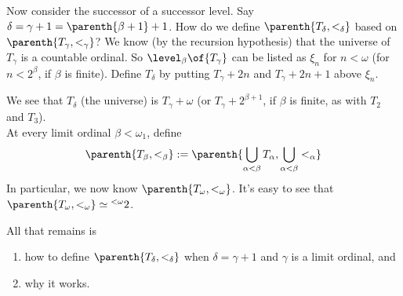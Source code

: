 \begin{boxconstruction}
    Now consider the successor of a successor level. Say $\delta = \gamma + 1 = \parenth{\beta + 1} + 1$. How do we define $\parenth{T_{\delta}, <_{\delta}}$ based on $\parenth{T_{\gamma}, <_{\gamma}}$? We know (by the recursion hypothesis) that the universe of $T_{\gamma}$ is a countable ordinal. So $\level_{\beta}\of{T_{\gamma}}$ can be listed as $\xi_n$ for $n < \omega$ (for $n < 2^{\beta}$, if $\beta$ is finite). Define $T_{\delta}$ by putting $T_{\gamma} + 2n$ and $T_{\gamma} + 2n + 1$ above $\xi_n$.
    \begin{figure}[H]
        \centering
    \end{figure}
    We see that $T_{\delta}$ (the universe) is $T_{\gamma} + \omega$ (or $T_{\gamma} + 2^{\beta + 1}$, if $\beta$ is finite, as with $T_2$ and $T_3$). \\

    At every limit ordinal $\beta < \omega_1$, define
    \begin{align*}
        \parenth{T_{\beta}, <_{\beta}} := \parenth{\bigcup_{\alpha < \beta} T_{\alpha}, \bigcup_{\alpha < \beta} <_{\alpha}}
    \end{align*}
    In particular, we now know $\parenth{T_{\omega}, <_{\omega}}$. It's easy to see that $\parenth{T_{\omega}, <_{\omega}} \simeq {^{<\omega}2}$.

    All that remains is
    \begin{enumerate}
        \item how to define $\parenth{T_{\delta}, <_{\delta}}$ when $\delta = \gamma + 1$ and $\gamma$ is a limit ordinal, and
        \item why it works.
    \end{enumerate}
\end{boxconstruction}